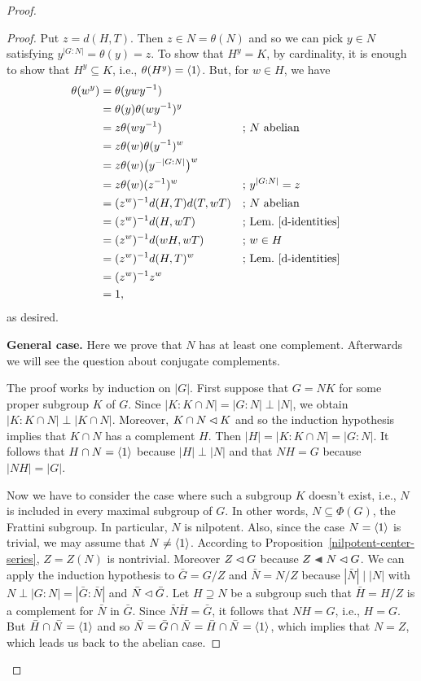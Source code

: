 \begin{proof}
\begin{proof}
    Put $z=d(H,T)$. Then $z\in N=\theta(N)$ and so we can pick $y\in N$ satisfying $y^{|G:N|}=\theta(y)=z$. To show that $H^y=K$, by cardinality, it is enough to show that $H^y\subseteq K$, i.e., $\theta(H^y)=\langle1\rangle$. But, for $w\in H$, we have
    \begin{align*}
        \theta(w^y) &= \theta(ywy^{-1})\\
            &= \theta(y)\theta(wy^{-1})^y\\
            &= z\theta(wy^{-1})   &&\text{; $N$ abelian}\\
            &= z\theta(w)\theta(y^{-1})^w\\
            &= z\theta(w)\big(y^{-|G:N|}\big)^w\\
            &= z\theta(w)(z^{-1})^w &&\text{; }y^{|G:N|}=z\\
            &= (z^w)^{-1}d(H,T)d(T,wT)  &&\text{; $N$ abelian}\\
            &= (z^w)^{-1}d(H,wT)    &&\text{; Lem.~\ref{d-identities}}\\
            &= (z^w)^{-1}d(wH,wT)   &&\text{; }w\in H\\
            &= (z^w)^{-1}d(H,T)^w    &&\text{; Lem.~\ref{d-identities}}\\
            &= (z^w)^{-1}z^w\\
            &= 1,
    \end{align*}
    as desired.

    \textbf{General case.} Here we prove that $N$ has at least one complement. Afterwards we will see the question about conjugate complements.
    
    The proof works by induction on $|G|$. First suppose that $G=NK$ for some proper subgroup $K$ of $G$. Since $|K:K\cap N|=|G:N|\perp|N|$, we obtain $|K:K\cap N|\perp|K\cap N|$. Moreover, $K\cap N\lhd K$ and so the induction hypothesis implies that $K\cap N$ has a complement $H$. Then $|H|=|K:K\cap N|=|G:N|$. It follows that $H\cap N=\langle1\rangle$ because $|H|\perp|N|$ and that $NH=G$ because $|NH|=|G|$.
    
    Now we have to consider the case where such a subgroup $K$ doesn't exist, i.e., $N$ is included in every maximal subgroup of $G$. In other words, $N\subseteq\Phi(G)$, the Frattini subgroup. In particular, $N$ is nilpotent. Also, since the case $N=\langle1\rangle$ is trivial, we may assume that $N\ne\langle1\rangle$. According to Proposition~\ref{nilpotent-center-series}, $Z=Z(N)$ is nontrivial. Moreover $Z\lhd G$ because $Z\ch N\normal G$. We can apply the induction hypothesis to $\bar G=G/Z$ and $\bar N=N/Z$ because $|\bar N|\mid|N|$ with $N\perp|G:N|=|\bar G:\bar N|$ and $\bar N\lhd\bar G$. Let $H\supseteq N$ be a subgroup such that $\bar H=H/Z$ is a complement for $\bar N$ in $\bar G$. Since $\bar N\bar H=\bar G$, it follows that $NH=G$, i.e., $H=G$. But $\bar H\cap\bar N=\langle1\rangle$ and so $\bar N=\bar G\cap\bar N=\bar H\cap \bar N=\langle1\rangle$, which implies that $N=Z$, which leads us back to the abelian case.


\end{proof}
\end{proof}

